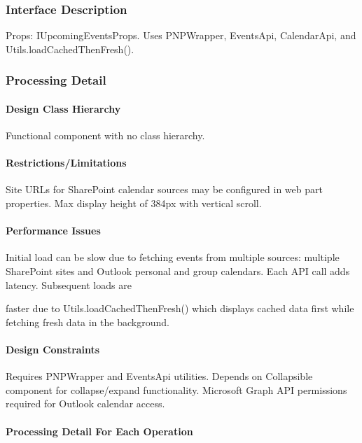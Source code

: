 \documentclass[12pt]{article}
\begin{document}
\subsubsection{Interface Description}

Props: IUpcomingEventsProps. Uses PNPWrapper, EventsApi, CalendarApi, and Utils.loadCachedThenFresh().

\subsubsection{Processing Detail}

\paragraph{Design Class Hierarchy}

Functional component with no class hierarchy.

\paragraph{Restrictions/Limitations}

Site URLs for SharePoint calendar sources may be configured in web part properties. Max display height of 384px with vertical scroll.

\paragraph{Performance Issues}

Initial load can be slow due to fetching events from multiple sources: multiple SharePoint sites and Outlook personal and group calendars. Each API call adds latency. Subsequent loads are

faster due to Utils.loadCachedThenFresh() which displays cached data first while fetching fresh data in the background.

\paragraph{Design Constraints}

Requires PNPWrapper and EventsApi utilities. Depends on Collapsible component for collapse/expand functionality. Microsoft Graph API permissions required for Outlook calendar access.

\paragraph{Processing Detail For Each Operation}
\end{document}
